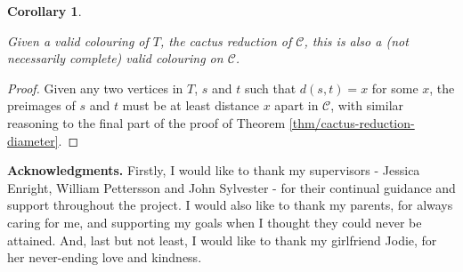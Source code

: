 \documentclass{mpaper}
\newtheorem{corollary}{Corollary}[section]
\begin{document}
\begin{corollary}
\label{cor/colouring-extension}

Given a valid colouring of $T$, the cactus reduction of $\mathcal{C}$, this is also a (not necessarily complete) valid colouring on $\mathcal{C}$.
\end{corollary}

\begin{proof}
Given any two vertices in $T$, $s$ and $t$ such that $d(s,t)=x$ for some $x$, the preimages of $s$ and $t$ must be at least distance $x$ apart in $\mathcal{C}$, with similar reasoning to the final part of the proof of Theorem \ref{thm/cactus-reduction-diameter}.
\end{proof}


{\bf Acknowledgments.}
Firstly, I would like to thank my supervisors - Jessica Enright, William Pettersson and John Sylvester - for their continual guidance and support throughout the project. I would also like to thank my parents, for always caring for me, and supporting my goals when I thought they could never be attained. And, last but not least, I would like to thank my girlfriend Jodie, for her never-ending love and kindness.



\end{document}

